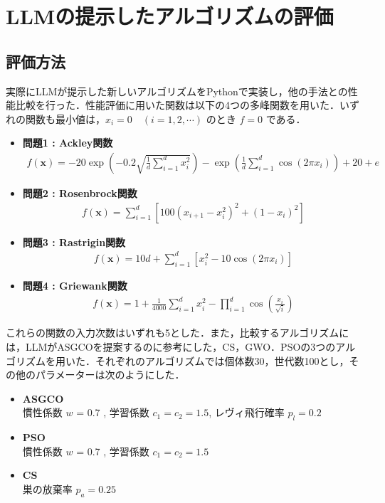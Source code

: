 \documentclass[a4paper]{ltjsarticle}
\begin{document}
\section{LLMの提示したアルゴリズムの評価}
\subsection{評価方法}
実際にLLMが提示した新しいアルゴリズムをPythonで実装し，他の手法との性能比較を行った．性能評価に用いた関数は以下の4つの多峰関数を用いた．いずれの関数も最小値は，$x_i = 0 \quad (i = 1, 2, \cdots)$ のとき $f = 0$ である．
\begin{itemize}
    \item \textbf{問題1 : Ackley関数}
        \begin{align*}
            f(\mathbf{x}) = -20 \exp\left(-0.2 \sqrt{\frac{1}{d} \sum_{i=1}^{d} x_i^2}\right) - \exp\left(\frac{1}{d} \sum_{i=1}^{d} \cos(2 \pi x_i)\right) + 20 + e
        \end{align*}
    \item \textbf{問題2 : Rosenbrock関数}
        \begin{align*}
            f(\mathbf{x}) = \sum_{i=1}^{d} \left[100 (x_{i+1} - x_i^2)^2 + (1 - x_i)^2\right]
        \end{align*}


    \item \textbf{問題3 : Rastrigin関数}
        \begin{align*}
            f(\mathbf{x}) = 10d + \sum_{i=1}^{d} \left[x_i^2 - 10 \cos(2 \pi x_i)\right]
        \end{align*}

    \item \textbf{問題4 : Griewank関数}
        \begin{align*}
            f(\mathbf{x}) = 1 + \frac{1}{4000} \sum_{i=1}^{d} x_i^2 - \prod_{i=1}^{d} \cos\left(\frac{x_i}{\sqrt{i}}\right)
        \end{align*}
\end{itemize}
これらの関数の入力次数はいずれも5とした．また，比較するアルゴリズムには，LLMがASGCOを提案するのに参考にした，CS，GWO．PSOの3つのアルゴリズムを用いた．それぞれのアルゴリズムでは個体数30，世代数100とし，その他のパラメーターは次のようにした．
\begin{itemize}
    \item \textbf{ASGCO}\\
        慣性係数 $w$ = 0.7 ,  学習係数 $c_1 = c_2 = 1.5$, レヴィ飛行確率 $p_l = 0.2$
    \item \textbf{PSO}\\
        慣性係数 $w$ = 0.7 ,  学習係数 $c_1 = c_2 = 1.5$
    \item \textbf{CS}\\
        巣の放棄率 $p_a = 0.25$
\end{itemize}
\end{document}
